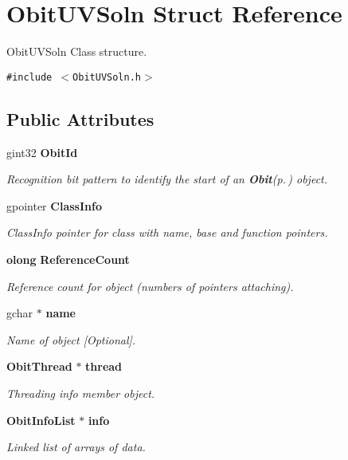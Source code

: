 \section{Obit\-UVSoln Struct Reference}
\label{structObitUVSoln}
Obit\-UVSoln Class structure.  


{\tt \#include $<$Obit\-UVSoln.h$>$}

\subsection*{Public Attributes}
\begin{CompactItemize}
\item 
gint32 {\bf Obit\-Id}
\begin{CompactList}\small\item\em Recognition bit pattern to identify the start of an {\bf Obit}{\rm (p.\,\pageref{structObit})} object. \item\end{CompactList}\item 
gpointer {\bf Class\-Info}
\begin{CompactList}\small\item\em Class\-Info pointer for class with name, base and function pointers. \item\end{CompactList}\item 
{\bf olong} {\bf Reference\-Count}
\begin{CompactList}\small\item\em Reference count for object (numbers of pointers attaching). \item\end{CompactList}\item 
gchar $\ast$ {\bf name}
\begin{CompactList}\small\item\em Name of object [Optional]. \item\end{CompactList}\item 
{\bf Obit\-Thread} $\ast$ {\bf thread}
\begin{CompactList}\small\item\em Threading info member object. \item\end{CompactList}\item 
{\bf Obit\-Info\-List} $\ast$ {\bf info}
\begin{CompactList}\small\item\em Linked list of arrays of data. \item\end{CompactList}\item 

\end{CompactItemize}
